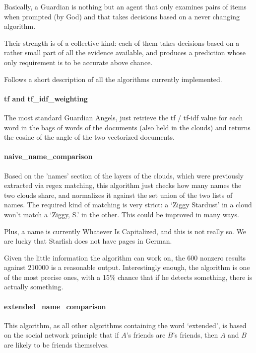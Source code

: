 \documentclass[11pt]{article}
\begin{document}
Basically, a Guardian is nothing but an agent that only examines pairs of items when prompted (by God) and that takes decisions based on a never changing algorithm.

Their strength is of a collective kind: each of them takes decisions based on a rather small part of all the evidence available, and produces a prediction whose only requirement is to be accurate above chance.

Follows a short description of all the algorithms currently implemented.


\paragraph{tf and tf\_idf\_weighting}

The most standard Guardian Angels, just retrieve the tf / tf-idf value for each word in the bags of words of the documents (also held in the clouds) and returns the cosine of the angle of the two vectorized documents.

\paragraph{naive\_name\_comparison}

Based on the 'names' section of the layers of the clouds, which were previously extracted via regex matching, this algorithm just checks how many names the two clouds share, and normalizes it against the set union of the two lists of names.
The required kind of matching is very strict: a `Ziggy Stardust' in a cloud won't match a `Ziggy, S.' in the other. This could be improved in many ways.

Plus, a name is currently Whatever Is Capitalized, and this is not really so. We are lucky that Starfish does not have pages in German.

Given the little information the algorithm can work on, the 600 nonzero results against 210000 is a reasonable output. Interestingly enough, the algorithm is one of the most precise ones, with a 15\% chance that if he detects something, there is actually something.

\paragraph{extended\_name\_comparison}

This algorithm, as all other algorithms containing the word `extended', is based on the social network principle that if $A$'s friends are $B$'s friends, then $A$ and $B$ are likely to be friends themselves.
\end{document}
